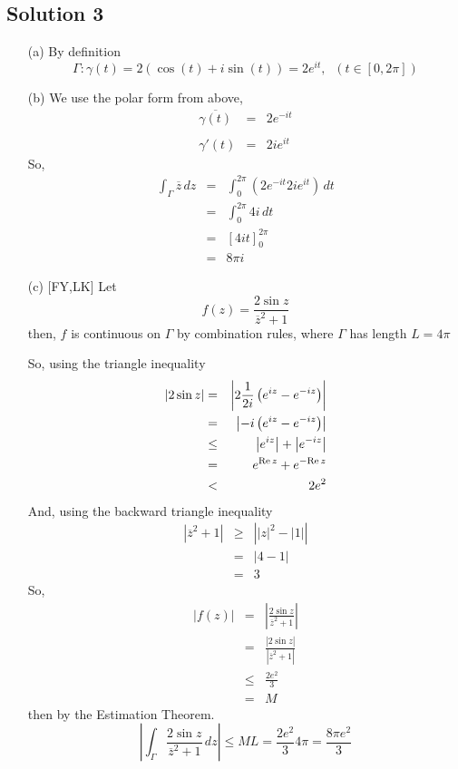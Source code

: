 \subsection*{Solution 3}

\begin{itemize}
\item[(a)]
By definition 
\[ \Gamma: \gamma(t) = 2(\cos(t) + i\sin(t)) = 2e^{it},\;\; (t\in[0,2\pi]) \]

\item[(b)]
We use the polar form from above,
\begin{eqnarray*}
\overline{\gamma(t)}
	&=& 2e^{-it}\\
\\
\gamma'(t)
	&=& 2ie^{it}
\end{eqnarray*}
So,
\begin{eqnarray*}
\int_\Gamma \overline{z}\,dz
	&=& \int_0^{2\pi} \left( 2e^{-it} 2ie^{it} \right) \, dt \\
	&=& \int_0^{2\pi} 4i\,dt \\
	&=& \left[ 4it \right]_0^{2\pi} \\
	&=& 8\pi i
\end{eqnarray*}

\item[(c)][FY,LK]
Let
\[ f(z) = \frac{ 2\sin z }{ \overline{z}^2+1 } \]
then, $f$ is continuous on $\Gamma$ by combination rules, where $\Gamma$
has length $L=4\pi$


So, using the triangle inequality
\begin{eqnarray*}
|2\sin z|
	&=& \left| 2\frac{1}{2i} \left( e^{iz} - e^{-iz} \right) \right| \\
	&=& \left| -i \left( e^{iz} - e^{-iz} \right) \right| \\
	&\le& \left| e^{iz} \right| + \left| e^{-iz} \right| \\
	&=& e^{{\rm Re}\,z} + e^{-{\rm Re}\,z} \\
	&<& 2e^2
\end{eqnarray*}
And, using the backward triangle inequality
\begin{eqnarray*}
\left| \overline{z}^2+1 \right|
	&\ge& \left| |z|^2 - |1| \right| \\
	&=& |4-1| \\
	&=& 3
\end{eqnarray*}
So,
\begin{eqnarray*}
|f(z)|	&=& \left| \frac{ 2\sin z }{ \overline{z}^2+1 } \right| \\
	&=& \frac{ |2\sin z| }{ \left| \overline{z}^2+1 \right| } \\
	&\le& \frac{2e^2}{3} \\
	&=& M
\end{eqnarray*}
then by the Estimation Theorem.
\[
\left| \int_\Gamma \frac{ 2\sin z }{ \overline{z}^2+1 }\,dz \right|
\le ML = \frac{2e^2}{3} 4\pi = \frac{8\pi e^2}{3} 
\]

\end{itemize}

